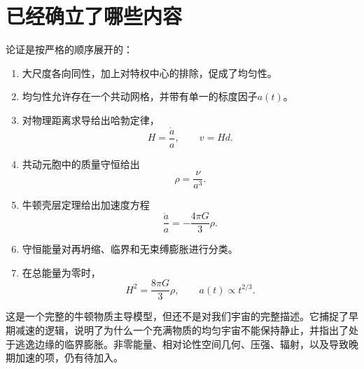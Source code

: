 \begin{classroomqa}
\end{classroomqa}

\section{已经确立了哪些内容}

论证是按严格的顺序展开的：
\begin{enumerate}
\item 大尺度各向同性，加上对特权中心的排除，促成了均匀性。
\item 均匀性允许存在一个共动网格，并带有单一的标度因子\(a(t)\)。
\item 对物理距离求导给出哈勃定律，
  \[
  H=\frac{\dot a}{a},
  \qquad
  v=Hd.
  \]
\item 共动元胞中的质量守恒给出
  \[
  \rho=\frac{\nu}{a^3}.
  \]
\item 牛顿壳层定理给出加速度方程
  \[
  \frac{\ddot a}{a}=-\frac{4\pi G}{3}\rho.
  \]
\item 守恒能量对再坍缩、临界和无束缚膨胀进行分类。
\item 在总能量为零时，
  \[
  H^2=\frac{8\pi G}{3}\rho,
  \qquad
  a(t)\propto t^{2/3}.
  \]
\end{enumerate}

这是一个完整的牛顿物质主导模型，但还不是对我们宇宙的完整描述。它捕捉了早期减速的逻辑，说明了为什么一个充满物质的均匀宇宙不能保持静止，并指出了处于逃逸边缘的临界膨胀。非零能量、相对论性空间几何、压强、辐射，以及导致晚期加速的项，仍有待加入。
